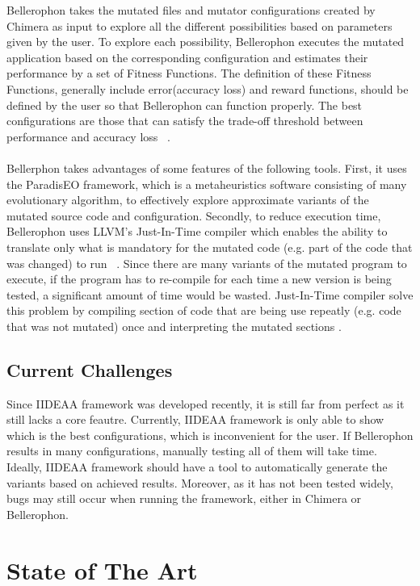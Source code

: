 Bellerophon takes the mutated files and mutator configurations created by Chimera as input to explore all the different possibilities based on parameters given by the user. To explore each possibility, Bellerophon executes the mutated application based on the corresponding configuration and estimates their performance by a set of Fitness Functions. The definition of these Fitness Functions, generally include error(accuracy loss) and reward functions, should be defined by the user so that Bellerophon can function properly. The best configurations are those that can satisfy the trade-off threshold between performance and accuracy loss ~\cite{iideaa}. \\
~\\
Bellerphon takes advantages of some features of the following tools. First, it uses the ParadisEO framework, which is a metaheuristics software consisting of many evolutionary algorithm, to effectively explore approximate variants of the mutated source code and configuration. Secondly, to reduce execution time, Bellerophon uses LLVM's Just-In-Time compiler which enables the ability to translate only what is mandatory for the mutated code (e.g. part of the code that was changed) to run ~\cite{iideaa}. Since there are many variants of the mutated program to execute, if the program has to re-compile for each time a new version is being tested, a significant amount of time would be wasted. Just-In-Time compiler solve this problem by compiling section of code that are being use repeatly (e.g. code that was not mutated) once and interpreting the mutated sections \cite{JIT}. \\

\subsection{Current Challenges}
Since IIDEAA framework was developed recently, it is still far from perfect as it still lacks a core feautre. Currently, IIDEAA framework is only able to show which is the best configurations, which is inconvenient for the user. If Bellerophon results in many configurations, manually testing all of them will take time. Ideally, IIDEAA framework should have a tool to automatically generate the variants based on achieved results. Moreover, as it has not been tested widely, bugs may still occur when running the framework, either in Chimera or Bellerophon. \\

\section{State of The Art}

